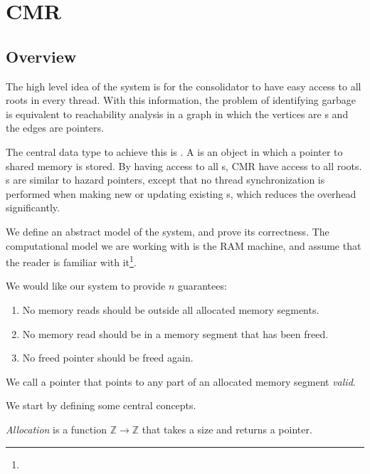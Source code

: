 \chapter{CMR}

\section{Overview}

The high level idea of the system is for the consolidator to have easy access to all roots in every
thread. With this information, the problem of identifying garbage is equivalent to reachability
analysis in a graph in which the vertices are s and the edges are pointers.

The central data type to achieve this is . A  is an object in which a
pointer to shared memory is stored. By having access to all s, CMR have access to all
roots. s are similar to hazard pointers, except that no thread synchronization is
performed when making new or updating existing s, which reduces the overhead
significantly.

\vspace{2cm}

We define an abstract model of the system, and prove its correctness.
The computational model we are working with is the RAM machine, and assume that
the reader is familiar with it\footnote{}.


We would like our system to provide $n$ guarantees:

\begin{enumerate}
  \item No memory reads should be outside all allocated memory segments.
  \item No memory read should be in a memory segment that has been freed.
  \item No freed pointer should be freed again.
\end{enumerate}

We call a pointer that points to any part of an allocated memory segment \emph{valid}.


We start by defining some central concepts.
\begin{definition}[allocation]
  \emph{Allocation} is a function $\mathbb{Z} \to \mathbb{Z}$ that takes a
  size and returns a pointer. 
\end{definition}


